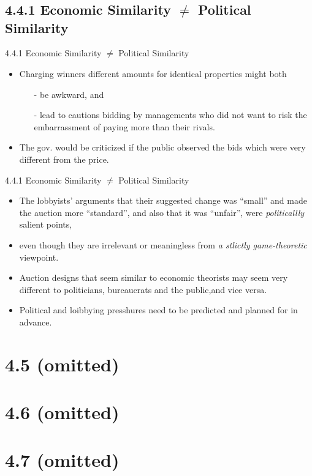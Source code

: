 \documentclass[uplatex,14pt,dvipdfmx,xcolor=svgnames]{beamer}
\begin{document}
\section{\secVI}
\newcommand{\ssecVIa}{4.4.1\! Economic\!\! Similarity \!$\neq$\! Political\!\! Similarity}
\subsection{\ssecVIa}
\begin{frame}[t]{\ssecVIa}
	
\begin{itemize}
	\item Charging winners different amounts for identical properties might both
	\begin{itemize}
		\item[-] be awkward, and
		\item[-] lead to cautions bidding by managements who did not want to risk the embarrassment of paying more than their rivals.
	\end{itemize}
	\item The gov. would be criticized if the public observed the bids which were very different from the price.  
\end{itemize}
	
\end{frame}

\begin{frame}[t]{\ssecVIa}
	
\begin{itemize}
	\item The lobbyists' arguments that their suggested change was ``small'' and made the auction more ``standard'', and also that it was ``unfair'', were \emph{politicallly} salient points,
	\item even though they are irrelevant or meaningless from \emph{a stlictly game-theoretic} viewpoint. 
	\item Auction designs that seem similar to economic theorists may seem very different to politicians, bureaucrats and the public,and vice versa.
	\item Political and loibbying presshures need to be predicted and planned for in advance.
\end{itemize}

\section{4.5 (omitted)}
\section{4.6 (omitted)}
\section{4.7 (omitted)}

\end{frame}
	
%	
%	
\end{document}
